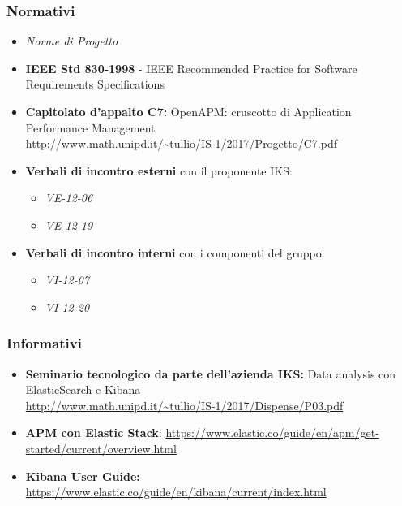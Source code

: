 	\subsubsection{Normativi}
	\begin{itemize}
		\item \emph{Norme di Progetto}
		\item \textbf{IEEE Std 830-1998} - IEEE Recommended Practice for Software Requirements Specifications
		\item \textbf{Capitolato d'appalto C7:} OpenAPM: cruscotto di Application Performance Management \\ \url{http://www.math.unipd.it/~tullio/IS-1/2017/Progetto/C7.pdf}
		\item \textbf{Verbali di incontro esterni } con il proponente IKS: \begin{itemize}
			\item \emph{VE-12-06}
			\item \emph{VE-12-19}
		\end{itemize}
		\item \textbf{Verbali di incontro interni }con i componenti del gruppo:
		\begin{itemize}
			\item \emph{VI-12-07}
			\item \emph{VI-12-20}
		\end{itemize}
	\end{itemize}
	
	\subsubsection{Informativi}
	\begin{itemize}
		\item \textbf{Seminario tecnologico da parte dell'azienda IKS:} Data analysis con ElasticSearch e Kibana \\ \url{http://www.math.unipd.it/~tullio/IS-1/2017/Dispense/P03.pdf}
		\item \textbf{APM con Elastic Stack}: \url{https://www.elastic.co/guide/en/apm/get-started/current/overview.html}
		\item \textbf{Kibana User Guide:} \url{https://www.elastic.co/guide/en/kibana/current/index.html}
	
	\end{itemize}
	